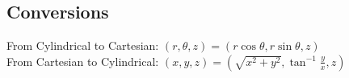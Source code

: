 \subsection{Conversions}
\noindent
From Cylindrical to Cartesian: $(r, \theta, z) = (r\cos{\theta}, r\sin{\theta}, z)$\\
From Cartesian to Cylindrical: $(x, y, z)=\left(\sqrt{x^2 + y^2}, \tan^{-1}{\frac{y}{x}}, z\right)$
